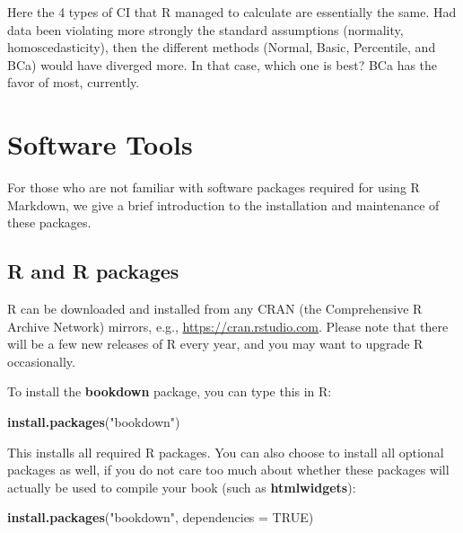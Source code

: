 \documentclass[
  12pt,
]{book}
\newenvironment{Shaded}{\begin{snugshade}}{\end{snugshade}}
\newcommand{\DataTypeTok}[1]{\textcolor[rgb]{0.13,0.29,0.53}{#1}}
\newcommand{\KeywordTok}[1]{\textcolor[rgb]{0.13,0.29,0.53}{\textbf{#1}}}
\newcommand{\NormalTok}[1]{#1}
\newcommand{\OtherTok}[1]{\textcolor[rgb]{0.56,0.35,0.01}{#1}}
\newcommand{\StringTok}[1]{\textcolor[rgb]{0.31,0.60,0.02}{#1}}
\begin{document}
Here the 4 types of CI that R managed to calculate are essentially the same. Had data been violating more strongly the standard assumptions (normality, homoscedasticity), then the different methods (Normal, Basic, Percentile, and BCa) would have diverged more. In that case, which one is best? BCa has the favor of most, currently.

\cleardoublepage

\hypertarget{appendix-appendix}{%
\appendix {}}


\hypertarget{software-tools}{%
\chapter{Software Tools}\label{software-tools}}

For those who are not familiar with software packages required for using R Markdown, we give a brief introduction to the installation and maintenance of these packages.

\hypertarget{r-and-r-packages}{%
\section{R and R packages}\label{r-and-r-packages}}

R can be downloaded and installed from any CRAN (the Comprehensive R Archive Network) mirrors, e.g., \url{https://cran.rstudio.com}. Please note that there will be a few new releases of R every year, and you may want to upgrade R occasionally.

To install the \textbf{bookdown} package, you can type this in R:

\begin{Shaded}
\begin{Highlighting}[]
\KeywordTok{install.packages}\NormalTok{(}\StringTok{"bookdown"}\NormalTok{)}
\end{Highlighting}
\end{Shaded}

This installs all required R packages. You can also choose to install all optional packages as well, if you do not care too much about whether these packages will actually be used to compile your book (such as \textbf{htmlwidgets}):

\begin{Shaded}
\begin{Highlighting}[]
\KeywordTok{install.packages}\NormalTok{(}\StringTok{"bookdown"}\NormalTok{, }\DataTypeTok{dependencies =} \OtherTok{TRUE}\NormalTok{)}
\end{Highlighting}
\end{Shaded}
\end{document}
